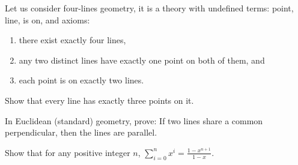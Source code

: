 \documentclass[addpoints]{exam}
\begin{document}
  \pagestyle{headandfoot}
  \runningheadrule

  \firstpagefooter{}{}{}
  \runningfooter{}{}{}
  \begin{flushright}

    \vspace{0.2in}
  \end{flushright}

  \begin{questions}
    \question[10]
      Let us consider four-lines geometry, it is a theory with undefined
			terms: point, line, is on, and axioms:
			\begin{enumerate}
			    \item there exist exactly four lines,
			    \item any two distinct lines have exactly one point on both of them, and
			    \item each point is on exactly two lines.
			\end{enumerate}
			
			Show that every line has exactly three points on it.

      \begin{solution}[\stretch{1}]
      \end{solution}
      \newpage
    \question[10]
      In Euclidean (standard) geometry, prove: If two lines share a common
			perpendicular, then the lines are parallel.

      \begin{solution}[\stretch{1}]
      \end{solution}
      \newpage
    \question[10]
      Show that for any positive integer $n$,
			$\sum_{i = 0}^n x^i = \frac{1 - x^{n + 1}}{1 - x}$.

      \begin{solution}[\stretch{1}]
      \end{solution}
      \newpage
  \end{questions}
\end{document}
